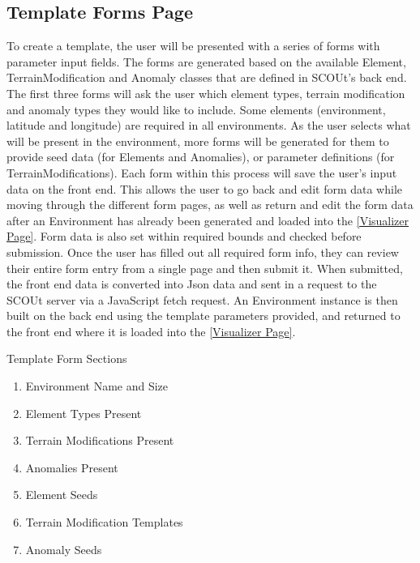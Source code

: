 \subsection{Template Forms Page}
To create a template, the user will be presented with a series of forms with parameter input fields.
The forms are generated based on the available Element, TerrainModification and Anomaly classes that are defined in SCOUt's back end.
The first three forms will ask the user which element types, terrain modification and anomaly types they would like to include.
Some elements (environment, latitude and longitude) are required in all environments.
As the user selects what will be present in the environment, more forms will be generated for them to provide seed data (for Elements and Anomalies), or parameter definitions (for TerrainModifications).
Each form within this process will save the user’s input data on the front end.
This allows the user to go back and edit form data while moving through the different form pages, as well as return and edit the form data after an Environment has already been generated and loaded into the \ref{Visualizer Page}.
Form data is also set within required bounds and checked before submission.
Once the user has filled out all required form info, they can review their entire form entry from a single page and then submit it.
When submitted, the front end data is converted into Json data and sent in a request to the SCOUt server via a JavaScript fetch request.
An Environment instance is then built on the back end using the template parameters provided, and returned to the front end where it is loaded into the \ref{Visualizer Page}.


Template Form Sections
\begin{enumerate}
  \item Environment Name and Size
  \item Element Types Present
  \item Terrain Modifications Present
  \item Anomalies Present
  \item Element Seeds
  \item Terrain Modification Templates
  \item Anomaly Seeds
\end{enumerate}



